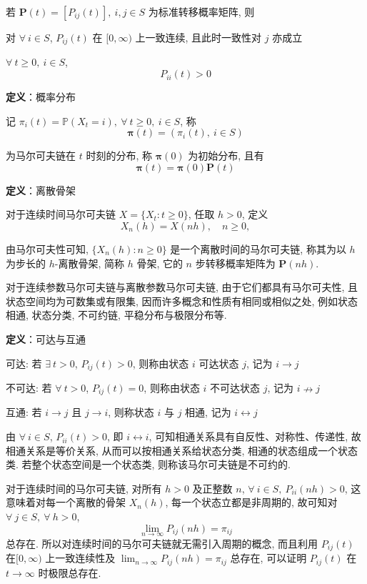 \documentclass[openany]{ctexbook}
\theoremstyle{kaiti}
\theoremstyle{normal}
\begin{document}
若 $\bm{P}(t)=[P_{ij}(t)],~i,j\in S$ 为标准转移概率矩阵, 则

对 $\forall~i\in S$, $P_{ij}(t)$ 在 $[0,\infty)$ 上一致连续, 且此时一致性对 $j$ 亦成立

$\forall~t\geqslant0,~i\in S$,
\begin{equation}
  P_{ii}(t)>0
\end{equation}

\textbf{定义}：概率分布

记 $\pi_i(t)=\mathbb{P}(X_t=i),~\forall~t\geqslant0,~i\in S$, 称 
\begin{equation}
  \bm{\pi}(t)=(\pi_i(t),~i\in S)
\end{equation}

为马尔可夫链在 $t$ 时刻的分布, 称 $\bm{\pi}(0)$ 为初始分布, 且有
\begin{equation}
  \bm{\pi}(t)=\bm{\pi}(0)\bm{P}(t)
\end{equation}

\textbf{定义}：离散骨架

对于连续时间马尔可夫链 $X=\{X_t:t\geqslant0\}$, 任取 $h>0$, 定义
\begin{equation}
  X_n(h)=X(nh),\quad n\geqslant0,
\end{equation}

由马尔可夫性可知, $\{X_n(h):n\geqslant0\}$ 是一个离散时间的马尔可夫链, 称其为以 $h$ 为步长的 $h$-离散骨架, 简称 $h$ 骨架, 它的 $n$ 步转移概率矩阵为 $\bm{P}(nh)$.

对于连续参数马尔可夫链与离散参数马尔可夫链, 由于它们都具有马尔可夫性, 且状态空间均为可数集或有限集, 因而许多概念和性质有相同或相似之处, 例如状态相通, 状态分类, 不可约链, 平稳分布与极限分布等.

\textbf{定义}：可达与互通

可达: 若 $\exists~t>0$, $P_{ij}(t)>0$, 则称由状态 $i$ 可达状态 $j$, 记为 $i\to j$

不可达: 若 $\forall~t>0$, $P_{ij}(t)=0$, 则称由状态 $i$ 不可达状态 $j$, 记为 $i\nrightarrow j$

互通: 若 $i\to j$ 且 $j\to i$, 则称状态 $i$ 与 $j$ 相通, 记为 $i\leftrightarrow j$

由 $\forall~i\in S$, $P_{ii}(t)>0$, 即 $i\leftrightarrow i$, 可知相通关系具有自反性、对称性、传递性, 故相通关系是等价关系, 从而可以按相通关系给状态分类, 相通的状态组成一个状态类. 若整个状态空间是一个状态类, 则称该马尔可夫链是不可约的.

对于连续时间的马尔可夫链, 对所有 $h>0$ 及正整数 $n$, $\forall~i\in S,~P_{ii}(nh)>0$, 这意味着对每一个离散的骨架 $X_n(h)$, 每一个状态立都是非周期的, 故可知对 $\forall~j\in S,~\forall~h>0$,
\begin{equation}
  \lim_{n\to\infty}P_{ij}(nh)=\pi_{ij}
\end{equation}
总存在. 所以对连续时间的马尔可夫链就无需引入周期的概念, 而且利用 $P_{ij}(t)$ 在$[0,\infty)$ 上一致连续性及 $\lim_{n\to\infty}P_{ij}(nh)=\pi_{ij}$ 总存在, 可以证明 $P_{ij}(t)$ 在 $t\to\infty$ 时极限总存在.
\end{document}
